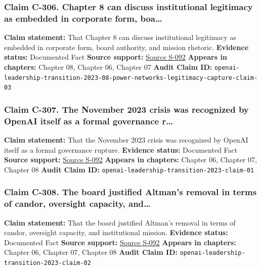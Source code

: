 \documentclass[
  american,
  11pt,
  letterpaper,
]{article}
\begin{document}
\subsubsection{Claim C-306. Chapter 8 can discuss institutional
legitimacy as embedded in corporate form,
boa\ldots{}}\label{claim-c-306-chapter-8-can-discuss-institutional-legitimacy-as-embedded-in-corporate-form-boa}

\textbf{Claim statement:} That Chapter 8 can discuss institutional
legitimacy as embedded in corporate form, board authority, and mission
rhetoric. \textbf{Evidence status:} Documented Fact \textbf{Source
support:}
\hyperref[source-s-092-openai-announces-leadership-transition]{Source
S-092} \textbf{Appears in chapters:} Chapter 08, Chapter 06, Chapter 07
\textbf{Audit Claim ID:}
\texttt{openai-leadership-transition-2023-08-power-networks-legitimacy-capture-claim-03}

\subsubsection{Claim C-307. The November 2023 crisis was recognized by
OpenAI itself as a formal governance
r\ldots{}}\label{claim-c-307-the-november-2023-crisis-was-recognized-by-openai-itself-as-a-formal-governance-r}

\textbf{Claim statement:} That the November 2023 crisis was recognized
by OpenAI itself as a formal governance rupture. \textbf{Evidence
status:} Documented Fact \textbf{Source support:}
\hyperref[source-s-092-openai-announces-leadership-transition]{Source
S-092} \textbf{Appears in chapters:} Chapter 06, Chapter 07, Chapter 08
\textbf{Audit Claim ID:}
\texttt{openai-leadership-transition-2023-claim-01}

\subsubsection{Claim C-308. The board justified Altman's removal in
terms of candor, oversight capacity,
and\ldots{}}\label{claim-c-308-the-board-justified-altmans-removal-in-terms-of-candor-oversight-capacity-and}

\textbf{Claim statement:} That the board justified Altman's removal in
terms of candor, oversight capacity, and institutional mission.
\textbf{Evidence status:} Documented Fact \textbf{Source support:}
\hyperref[source-s-092-openai-announces-leadership-transition]{Source
S-092} \textbf{Appears in chapters:} Chapter 06, Chapter 07, Chapter 08
\textbf{Audit Claim ID:}
\texttt{openai-leadership-transition-2023-claim-02}
\end{document}
